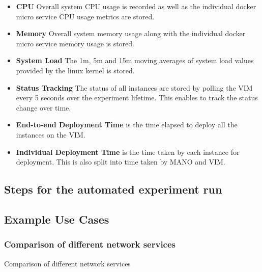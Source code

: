 \begin{itemize}
	\item{\textbf{CPU}} Overall system CPU usage is recorded as well as the individual docker micro service CPU usage metrics are stored.
	\item{\textbf{Memory}} Overall system memory usage along with the individual docker micro service memory usage is stored.
	\item{\textbf{System Load}} The 1m, 5m and 15m moving averages of system load values provided by the linux kernel is stored.
	\item{\textbf{Status Tracking}} The status of all instances are stored by polling the VIM every 5 seconds over the experiment lifetime. This enables to track the status change over time.
	\item{\textbf{End-to-end Deployment Time}} is the time elapsed to deploy all the instances on the VIM.
	\item{\textbf{Individual Deployment Time}} is the time taken by each instance for deployment. This is also split into time taken by MANO and VIM.
\end{itemize}

\subsection{Steps for the automated experiment run} 

\subsection{Example Use Cases}

\subsubsection{Comparison of different network services} 

Comparison of different network services

